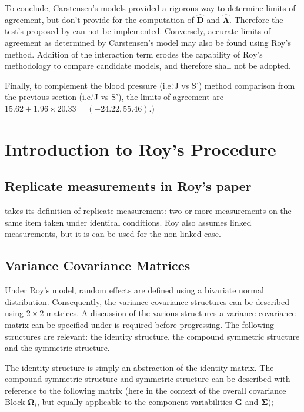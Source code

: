 \documentclass[12pt, a4paper]{report}
\theoremstyle{plain}
\theoremstyle{definition}
\theoremstyle{remark}
\begin{document}
To conclude, Carstensen's models provided a rigorous way to determine limits of agreement, but don't provide for the computation of $\boldsymbol{\hat{D}}$ and $\boldsymbol{\hat{\Lambda}}$. Therefore the test's proposed by \citet{roy} can not be implemented. Conversely, accurate limits of agreement as determined by Carstensen's model may also be found using Roy's method. Addition of the interaction term erodes the capability of Roy's methodology to compare candidate models, and therefore shall not be adopted.

Finally, to complement the blood pressure (i.e.`J vs S') method comparison from the previous section (i.e.`J vs S'), the limits of agreement are $15.62 \pm 1.96 \times 20.33 = (-24.22, 55.46)$.)


\chapter{Introduction to Roy's Procedure}

\section{Replicate measurements in Roy's paper}
\citet{ARoy2009} takes its definition of replicate measurement: two or more measurements on the same item taken
under identical conditions. Roy also assumes linked measurements, but it is can be used for the non-linked case.


\section{Variance Covariance Matrices }

Under Roy's model, random effects are defined using a bivariate normal distribution. Consequently, the variance-covariance structures can be described using $2 \times 2$  matrices. A discussion of the various structures a variance-covariance matrix can be specified under is required before progressing. The following structures are relevant: the identity structure, the compound symmetric structure and the symmetric structure.

The identity structure is simply an abstraction of the identity matrix. The compound symmetric structure and symmetric structure can be described with reference to the following matrix (here in the context of the overall covariance Block-$\boldsymbol{\Omega}_i$, but equally applicable to the component variabilities $\boldsymbol{G}$ and $\boldsymbol{\Sigma}$);
\end{document}
